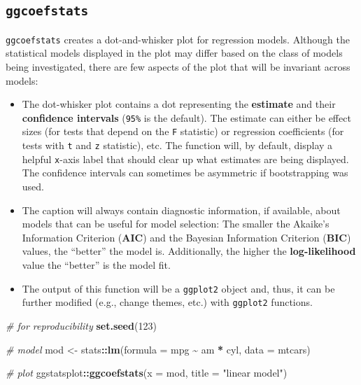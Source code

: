 \documentclass[
]{article}
\newenvironment{Shaded}{\begin{snugshade}}{\end{snugshade}}
\newcommand{\CommentTok}[1]{\textcolor[rgb]{0.56,0.35,0.01}{\textit{#1}}}
\newcommand{\DataTypeTok}[1]{\textcolor[rgb]{0.13,0.29,0.53}{#1}}
\newcommand{\DecValTok}[1]{\textcolor[rgb]{0.00,0.00,0.81}{#1}}
\newcommand{\KeywordTok}[1]{\textcolor[rgb]{0.13,0.29,0.53}{\textbf{#1}}}
\newcommand{\NormalTok}[1]{#1}
\newcommand{\OperatorTok}[1]{\textcolor[rgb]{0.81,0.36,0.00}{\textbf{#1}}}
\newcommand{\StringTok}[1]{\textcolor[rgb]{0.31,0.60,0.02}{#1}}
\begin{document}
\hypertarget{ggcoefstats}{%
\subsection{\texorpdfstring{\texttt{ggcoefstats}}{ggcoefstats}}\label{ggcoefstats}}

\texttt{ggcoefstats} creates a dot-and-whisker plot for regression models. Although the
statistical models displayed in the plot may differ based on the class of models
being investigated, there are few aspects of the plot that will be invariant
across models:

\begin{itemize}
\item
  The dot-whisker plot contains a dot representing the \textbf{estimate} and their
  \textbf{confidence intervals} (\texttt{95\%} is the default). The estimate can either be
  effect sizes (for tests that depend on the \texttt{F} statistic) or regression
  coefficients (for tests with \texttt{t} and \texttt{z} statistic), etc. The function will, by
  default, display a helpful \texttt{x}-axis label that should clear up what estimates are
  being displayed. The confidence intervals can sometimes be asymmetric if
  bootstrapping was used.
\item
  The caption will always contain diagnostic information, if available, about
  models that can be useful for model selection: The smaller the Akaike's
  Information Criterion (\textbf{AIC}) and the Bayesian Information Criterion (\textbf{BIC})
  values, the ``better'' the model is. Additionally, the higher the
  \textbf{log-likelihood} value the ``better'' is the model fit.
\item
  The output of this function will be a \texttt{ggplot2} object and, thus, it can be
  further modified (e.g., change themes, etc.) with \texttt{ggplot2} functions.
\end{itemize}

\begin{Shaded}
\begin{Highlighting}[]
\CommentTok{\# for reproducibility}
\KeywordTok{set.seed}\NormalTok{(}\DecValTok{123}\NormalTok{)}

\CommentTok{\# model}
\NormalTok{mod <{-}}\StringTok{ }\NormalTok{stats}\OperatorTok{::}\KeywordTok{lm}\NormalTok{(}\DataTypeTok{formula =}\NormalTok{ mpg }\OperatorTok{\textasciitilde{}}\StringTok{ }\NormalTok{am }\OperatorTok{*}\StringTok{ }\NormalTok{cyl, }\DataTypeTok{data =}\NormalTok{ mtcars)}

\CommentTok{\# plot}
\NormalTok{ggstatsplot}\OperatorTok{::}\KeywordTok{ggcoefstats}\NormalTok{(}\DataTypeTok{x =}\NormalTok{ mod, }\DataTypeTok{title =} \StringTok{"linear model"}\NormalTok{)}
\end{Highlighting}
\end{Shaded}
\end{document}
